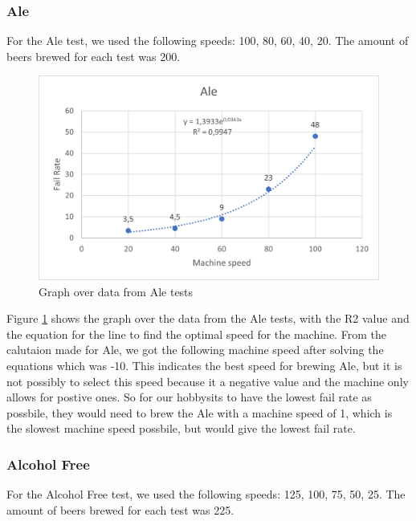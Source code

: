 \subsubsection{Ale}
For the Ale test, we used the following speeds: 100, 80, 60, 40, 20. The amount of beers brewed for each test was 200.

\begin{center}
    \centering
    \begin{figure}[H]
        \includegraphics[width=1\textwidth]{img/Ale_graph.png}
        \caption{Graph over data from Ale tests}
        \label{fig:Ale_graph}
    \end{figure}
\end{center}

Figure \ref{fig:Ale_graph} shows the graph over the data from the Ale tests, with the R2 value and the equation for the line to find the optimal speed for the machine. \newline
From the calutaion made for Ale, we got the following machine speed after solving the equations which was -10. This indicates the best speed for brewing Ale, but it is not possibly to select this speed because it a negative value and the machine only allows for postive ones. 
So for our hobbysits to have the lowest fail rate as possbile, they would need to brew the Ale with a machine speed of 1, which is the slowest machine speed possbile, but would give the lowest fail rate. \newline


\subsubsection{Alcohol Free}
For the Alcohol Free test, we used the following speeds: 125, 100, 75, 50, 25. The amount of beers brewed for each test was 225.

